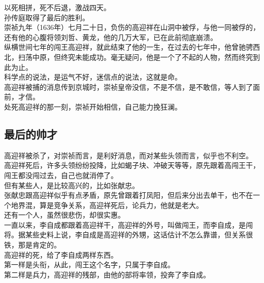 \begin{multicols}{\theparacolNo}
以死相拼，死不后退，激战四天。\\

孙传庭取得了最后的胜利。\\

崇祯九年（1636年）七月二十日，负伤的高迎祥在山洞中被俘，与他一同被俘的，还有他的心腹将领刘哲、黄龙，他的几万大军，已在此前彻底崩溃。\\

纵横世间七年的闯王高迎祥，就此结束了他的一生，在过去的七年中，他曾驰骋西北，扫荡中原，但终究未能成功。毫无疑问，他是一个了不起的人物，然而终究到此为止。\\

科学点的说法，是运气不好，迷信点的说法，这就是命。\\

高迎祥被捕的消息传到京城时，崇祯皇帝没信，不是不信，是不敢信，等人到了面前，才信。\\

处死高迎祥的那一刻，崇祯开始相信，自己能力挽狂澜。\\

\subsection{最后的帅才}
高迎祥被杀了，对崇祯而言，是利好消息，而对某些头领而言，似乎也不利空。\\

高迎祥死后，许多头领纷纷投降，比如蝎子块、冲破天等等，原先跟着高闯王干，闯王都没闯过去，自己也就消停了。\\

但有某些人，是比较高兴的，比如张献忠。\\

张献忠跟高迎祥似乎有点矛盾，原先曾跟着打凤阳，但后来分出去单干，也不在一个地界混，算是竞争关系，高迎祥死后，论兵力，他就是老大。\\

还有一个人，虽然很悲伤，却很实惠。\\

一直以来，李自成都跟着高迎祥干，高迎祥的外号，叫做闯王，而李自成，是闯将。据某些史料上说，李自成是高迎祥的外甥，这话估计不怎么靠谱，但关系很铁，那是肯定的。\\

高迎祥的死，给了李自成两样东西。\\

第一样是头衔，从此，闯王这个名字，只属于李自成。\\

第二样是兵力，高迎祥的残部，由他的部将率领，投奔了李自成。\\


\end{multicols}
